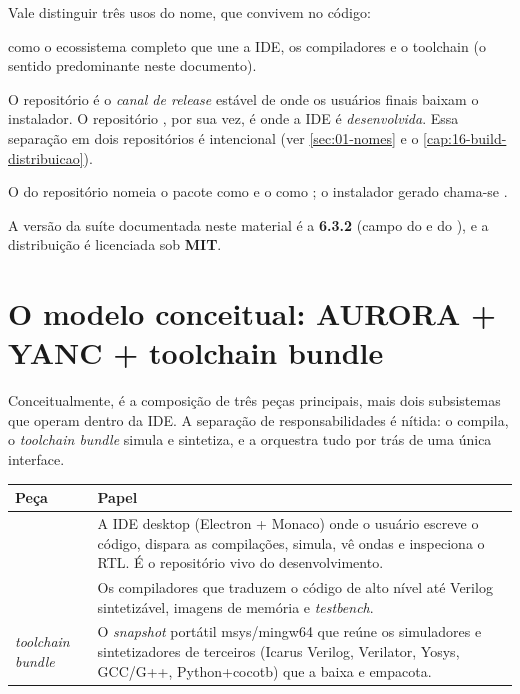 Vale distinguir três usos do nome, que convivem no código:

\begin{description}[leftmargin=1.4em]
  \item[A plataforma/suíte.]  como o ecossistema completo que une a
        IDE, os compiladores e o toolchain (o sentido predominante neste
        documento).
  \item[O canal de distribuição.] O repositório  é o \emph{canal de
        release} estável de onde os usuários finais baixam o instalador. O
        repositório , por sua vez, é onde a IDE é
        \emph{desenvolvida}. Essa separação em dois repositórios é intencional
        (ver \autoref{sec:01-nomes} e o \autoref{cap:16-build-distribuicao}).
  \item[O produto empacotado.] O  do repositório 
        nomeia o pacote como  e o  como
        ; o instalador gerado chama-se
        .
\end{description}

A versão da suíte documentada neste material é a \textbf{6.3.2} (campo
 do  e do ), e a distribuição
é licenciada sob \textbf{MIT}.

\section{O modelo conceitual: AURORA + YANC + toolchain bundle}
\label{sec:01-modelo-conceitual}

Conceitualmente,  é a composição de três peças principais, mais dois
subsistemas que operam dentro da IDE. A separação de responsabilidades é nítida:
o  compila, o \emph{toolchain bundle} simula e sintetiza, e a
 orquestra tudo por trás de uma única interface.

\begin{tabularx}{\linewidth}{l Y}
\toprule
\textbf{Peça} & \textbf{Papel} \\
\midrule
{} & A IDE desktop (Electron + Monaco) onde o usuário escreve o
código, dispara as compilações, simula, vê ondas e inspeciona o RTL. É o
repositório vivo do desenvolvimento. \\
 & Os compiladores que traduzem o código de alto nível até Verilog
sintetizável, imagens de memória e \emph{testbench}. \\
\emph{toolchain bundle} & O \emph{snapshot} portátil msys/mingw64 que reúne os
simuladores e sintetizadores de terceiros (Icarus Verilog, Verilator, Yosys,
GCC/G++, Python+cocotb) que a  baixa e empacota. \\
\bottomrule
\end{tabularx}

